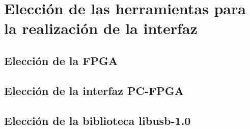 \chapter{Elección de las herramientas para la realización de la interfaz}
	\label{cap:mats}
	
	\section{Elección de la FPGA}
		
	\section{Elección de la interfaz PC-FPGA}
			
	\section{Elección de la biblioteca libusb-1.0}
		
	
%		
%		
%		
		